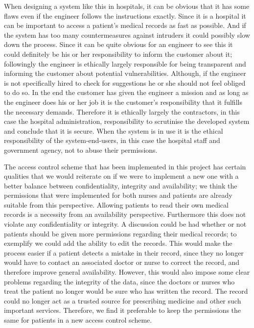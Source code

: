 \documentclass{article}
\begin{document}
When designing a system like this in hospitals, it can be obvious that it has some flaws even if the engineer follows the instructions exactly. Since it is a hospital it can be important to access a patient’s medical records as fast as possible. And if the system has too many countermeasures against intruders it could possibly slow down the process. Since it can be quite obvious for an engineer to see this it could definitely be his or her responsibility to inform the customer about it; followingly the engineer is ethically largely responsible for being transparent and informing the customer about potential vulnerabilities.  Although, if the engineer is not specifically hired to check for suggestions he or she should not feel obliged to do so. In the end the customer has given the engineer a mission and as long as the engineer does his or her job it is the customer’s responsibility that it fulfills the necessary demands. Therefore it is ethically largely the contractors, in this case the hospital administration, responsibility to scrutinise the developed system and conclude that it is secure. When the system is in use it is the ethical responsibility of the system-end-users, in this case the hospital staff and government agency, not to abuse their permissions. 

The access control scheme that has been implemented in this project has certain qualities that we would reiterate on if we were to implement a new one with a better balance between confidentiality, integrity and availability; we think the permissions that were implemented for both nurses and patients are already suitable from this perspective. Allowing patients to read their own medical records is a necessity from an availability perspective. Furthermore this does not violate any confidentiality or integrity. A discussion could be had whether or not patients should be given more permissions regarding their medical records; to exemplify we could add the ability to edit the records. This would make the process easier if a patient detects a mistake in their record, since they no longer would have to contact an associated doctor or nurse to correct the record, and therefore improve general availability. However, this would also impose some clear problems regarding the integrity of the data, since the doctors or nurses who treat the patient no longer would be sure who has written the record. The record could no longer act as a trusted source for prescribing medicine and other such important services. Therefore, we find it preferable to keep the permissions the same for patients in a new access control scheme. 
\end{document}
